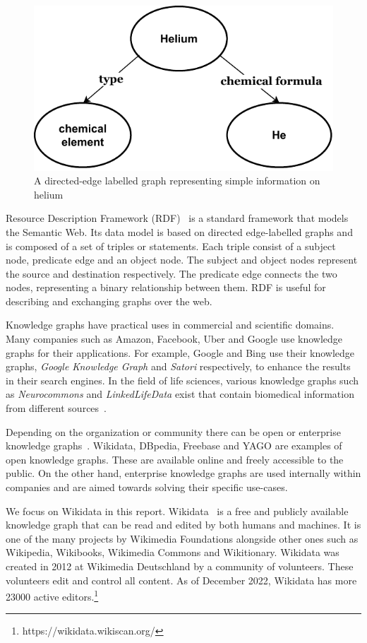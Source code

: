 \begin{figure}[h]
  \centering
  \includegraphics[width=0.75 \linewidth]{images/knowledge_graph.drawio.pdf}
  \caption{A directed-edge labelled graph representing simple information on helium}
  \label{fig:1}
\end{figure}
Resource Description Framework (RDF)~\cite{R.Cyganiak2014} is a standard framework that models the Semantic Web. Its data model is based on directed edge-labelled graphs and is composed of a set of triples or statements. Each triple consist of a subject node, predicate edge and an object node. The subject and object nodes represent the source and destination respectively. The predicate edge connects the two nodes, representing a binary relationship between them. RDF is useful for describing and exchanging graphs over the web. 

Knowledge graphs have practical uses in commercial and scientific domains. Many companies such as Amazon, Facebook, Uber and Google use knowledge graphs for their applications. For example, Google and Bing use their knowledge graphs, \textit{Google Knowledge Graph} and \textit{Satori} respectively, to enhance the results in their search engines. In the field of life sciences, various knowledge graphs such as \textit{Neurocommons} and \textit{LinkedLifeData} exist that contain biomedical information from different sources~\cite{Nickel2015}. 

Depending on the organization or community there can be open or enterprise knowledge graphs~\cite{Hogan2021}. Wikidata, DBpedia, Freebase and YAGO are examples of open knowledge graphs. These are available online and freely accessible to the public. On the other hand, enterprise knowledge graphs are used internally within companies and are aimed towards solving their specific use-cases.

We focus on Wikidata in this report. Wikidata~\cite{Foundationa} is a free and publicly available knowledge graph that can be read and edited by both humans and machines. It is one of the many projects by Wikimedia Foundations alongside other ones such as Wikipedia, Wikibooks, Wikimedia Commons and Wikitionary. Wikidata was created in 2012 at Wikimedia Deutschland by a community of volunteers. These volunteers edit and control all content. As of December 2022, Wikidata has more 23000 active editors.\footnote{https://wikidata.wikiscan.org/}


